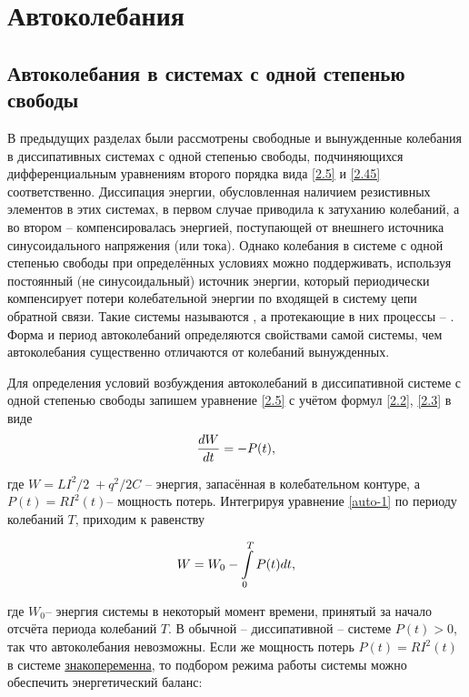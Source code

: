 \section{Автоколебания}

\subsection{Автоколебания в системах с одной степенью свободы}
В предыдущих разделах были рассмотрены свободные и вынужденные колебания в диссипативных системах с одной степенью свободы, подчиняющихся дифференциальным уравнениям второго порядка вида \eqref{2.5} и \eqref{2.45} соответственно. Диссипация энергии, обусловленная наличием резистивных элементов в этих системах, в первом случае приводила к затуханию колебаний, а во втором -- компенсировалась энергией, поступающей от
внешнего источника синусоидального напряжения (или тока). Однако колебания в системе с одной степенью свободы при определённых условиях можно поддерживать, используя постоянный (не синусоидальный) источник энергии, который периодически компенсирует потери колебательной энергии по входящей в систему цепи обратной связи. Такие системы называются , а протекающие в них процессы --
. Форма и период автоколебаний определяются свойствами самой системы, чем автоколебания существенно отличаются от колебаний вынужденных.

Для определения условий возбуждения автоколебаний в диссипативной системе с одной степенью свободы запишем уравнение \eqref{2.5} с учётом формул \eqref{2.2}, \eqref{2.3} в виде 
\begin{equation}
	\eqmark{auto-1}
	\frac{dW}{dt}=-P(t),
\end{equation}

где $W={LI^2}/{2}\;+{q^2}/{2C}$ -- энергия, запасённая в колебательном контуре, а $P(t)=R{{I}^{2}}(t)$-- мощность потерь. Интегрируя уравнение \eqref{auto-1} по периоду колебаний $T$, приходим к равенству

\begin{equation}
	\eqmark{auto-2}
	W=W_0-\int\limits_{0}^{T}P(t)dt,
\end{equation}

где $W_0$-- энергия системы в некоторый момент времени, принятый за начало отсчёта периода колебаний $T$. В обычной -- диссипативной -- системе $P(t)>0$, так что автоколебания невозможны. Если же мощность потерь $P(t)=R{{I}^{2}}(t)$ в системе \underline{знакопеременна}, то подбором режима работы системы можно обеспечить энергетический баланс:

